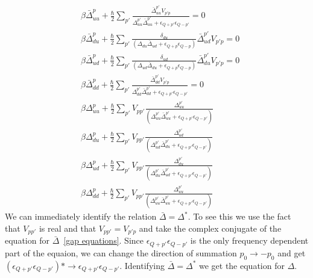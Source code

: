 \documentclass{article}
\begin{document}
\begin{align}
 &\beta{\bar{\Delta}}_{uu}^{p} + \frac{\hbar}{2} \sum_{p'} \frac{\bar{\Delta}_{uu}^{p'}  V_{p'p}}{\Delta_{uu}^{p'} \bar{\Delta}_{uu}^{p'} + \epsilon_{Q+p'} \epsilon_{Q-p'}}  = 0\nonumber\\
     &\beta \bar{\Delta}_{du}^p + \frac{\hbar}{2} \sum_{p'} \frac{\delta_{du}}{\left(\Delta_{du} \bar{\Delta}_{ud} + \epsilon_{Q+p} \epsilon_{Q-p}\right)} \bar{\Delta}_{ud}^{p'} V_{p'p}  = 0\nonumber\\
     &\beta \bar{\Delta}^{p}_{ud} + \frac{\hbar}{2} \sum_{p'} \frac{\delta_{ud}}{\left(\Delta_{ud} \bar{\Delta}_{du} + \epsilon_{Q+p} \epsilon_{Q-p}\right)} \bar{\Delta}_{du}^{p'} V_{p'p} = 0 \nonumber \\
     &\beta{\bar{\Delta}}_{dd}^{p} + \frac{\hbar}{2} \sum_{p'} \frac{\bar{\Delta}_{dd}^{p'}  V_{p'p}}{\Delta_{dd}^{p'} \bar{\Delta}_{dd}^{p'} + \epsilon_{Q+p'} \epsilon_{Q-p'}}  = 0\nonumber \\
    &\beta \Delta_{uu}^p + \frac{\hbar}{2} \sum_{p'} V_{pp'} \frac{\Delta^{p'}_{uu}}{\left( \Delta^{p'}_{uu} \bar{\Delta}^{p'}_{uu} + \epsilon_{Q+p'} \epsilon_{Q-p'}\right)}\nonumber \\
    &\beta \Delta_{du}^p + \frac{\hbar}{2} \sum_{p'} V_{pp'} \frac{\Delta^{p'}_{ud}}{\left( \Delta^{p'}_{ud} \bar{\Delta}^{p'}_{du} + \epsilon_{Q+p'} \epsilon_{Q-p'}\right)} \nonumber \\
    &\beta \Delta_{ud}^p + \frac{\hbar}{2} \sum_{p'} V_{pp'} \frac{\Delta^{p'}_{du}}{\left( \Delta^{p'}_{du} \bar{\Delta}^{p'}_{ud} + \epsilon_{Q+p'} \epsilon_{Q-p'}\right)}\nonumber \\
    &\beta \Delta_{dd}^p + \frac{\hbar}{2} \sum_{p'} V_{pp'} \frac{\Delta^{p'}_{uu}}{\left( \Delta^{p'}_{uu} \bar{\Delta}^{p'}_{uu} + \epsilon_{Q+p'} \epsilon_{Q-p'}\right)}
\label{gap equations}
\end{align}
We can immediately identify the relation $\bar{\Delta} = \Delta^*$. To see this we use the fact that $V_{pp'}$ is real and that $V_{pp'} = V_{p'p}$ and take the complex conjugate of the equation for $\bar{\Delta}$~\cref{gap equations}. Since $\epsilon_{Q + p'}\epsilon_{Q-p'}$ is the only frequency dependent part of the equaion, we can change the direction of summation $p_0 \rightarrow -p_0$ and get $(\epsilon_{Q + p'}\epsilon_{Q-p'})* \rightarrow \epsilon_{Q + p'}\epsilon_{Q-p'}$. Identifying $\bar{\Delta} = \Delta^*$ we get the equation for $\Delta$.
\end{document}
